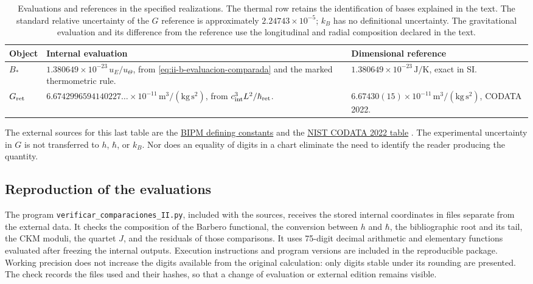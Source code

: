 \begin{table}[htbp]
\centering\small
\begin{tabularx}{\linewidth}{@{}lXX@{}}
\toprule
Object & Internal evaluation & Dimensional reference\\
\midrule
\(B_*\) & \(1.380649\times10^{-23}\,u_E/u_\Theta\),
from \eqref{eq:ii-b-evaluacion-comparada} and the marked thermometric rule.
& \(1.380649\times10^{-23}\,\mathrm{J/K}\), exact in SI.\\[4pt]
\(G_{\rm ret}\) & \(6.6742996594140227\ldots\times10^{-11}\,
\mathrm{m^3/(kg\,s^2)}\), from \(c_{\rm int}^3L^2/\hbar_{\rm ret}\).
& \(6.67430(15)\times10^{-11}\,\mathrm{m^3/(kg\,s^2)}\), CODATA 2022.\\
\bottomrule
\end{tabularx}
\caption{Evaluations and references in the specified realizations.
The thermal row retains the identification of bases explained in the text.
The standard
relative uncertainty of the \(G\) reference is approximately
\(2.24743\times10^{-5}\); \(k_B\) has no definitional uncertainty.
The gravitational evaluation and its difference from the reference use
the longitudinal and radial composition declared in the text.}
\label{tab:ii-kb-g-cartas}
\end{table}

The external sources for this last table are the
\href{https://www.bipm.org/en/measurement-units/si-defining-constants}
{BIPM defining constants} and the
\href{https://physics.nist.gov/cuu/Constants/Table/allascii.txt}
{NIST CODATA 2022 table} \cite{codata2022}.
The experimental uncertainty in \(G\) is not transferred to \(h\),
\(\hbar\), or \(k_B\). Nor does an equality of digits in a chart
eliminate the need to identify the reader producing the quantity.

\subsection{Reproduction of the evaluations}

The program \texttt{verificar\_comparaciones\_II.py}, included with the
sources, receives the stored internal coordinates in files separate
from the external data. It checks the composition of the Barbero functional,
the conversion between \(h\) and \(\hbar\), the bibliographic root and its tail,
the CKM moduli, the quartet \(J\), and the residuals of those comparisons. It uses
75-digit decimal arithmetic and elementary functions evaluated after
freezing the internal outputs. Execution instructions and program versions
are included in the reproducible package.
Working precision does not increase the digits available from the
original calculation: only digits stable under its rounding are presented.
The check records the files used and their hashes, so that
a change of evaluation or external edition remains visible.

